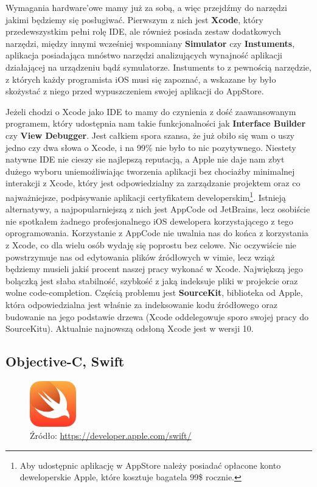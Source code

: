 \documentclass{article}
\begin{document}
Wymagania hardware'owe mamy już za sobą, a więc przejdźmy do narzędzi jakimi będziemy
się posługiwać. Pierwszym z nich jest \textbf{Xcode}, który przedewszystkim pełni
rolę IDE, ale również posiada zestaw dodatkowych narzędzi, między innymi wcześniej
wspomniany \textbf{Simulator} czy \textbf{Instuments}, aplikacja posiadająca mnóstwo
narzędzi analizujących wynajność aplikacji działającej na urządzeniu bądź symulatorze.
Instuments to z pewnością narzędzie, z których każdy programista iOS musi się
zapoznać, a wskazane by było skożystać z niego przed wypuszczeniem swojej aplikacji
do AppStore.

Jeżeli chodzi o Xcode jako IDE to mamy do czynienia z dość zaawansowanym programem,
który udostępnia nam takie funkcjonalności jak \textbf{Interface Builder} czy
\textbf{View Debugger}. Jest całkiem spora szansa, że już obiło się wam o uszy
jedno czy dwa słowa o Xcode, i na 99\% nie było to nic pozytywnego. Niestety 
natywne IDE nie cieszy sie najlepszą reputacją, a Apple nie daje nam zbyt dużego 
wyboru uniemożliwiając tworzenia aplikacji bez chociażby minimalnej interakcji
z Xcode, który jest odpowiedzialny za zarządzanie projektem oraz co najważniejsze,
podpisywanie aplikacji certyfikatem developerskim\footnote{Aby udostępnic aplikację
w AppStore należy posiadać opłacone konto deweloperskie Apple, które kosztuje 
bagatela 99\$ rocznie.}. Istnieją alternatywy, a najpopularniejszą z nich jest
AppCode od JetBrains, lecz osobiście nie spotkałem żadnego profesjonalnego iOS
dewelopera korzystającego z tego oprogramowania. Korzystanie z AppCode nie
uwalnia nas do końca z korzystania z Xcode, co dla wielu osób wydaję się poprostu
bez celowe. Nic oczywiście nie powstrzymuje nas od edytowania plików źródłowych
w vimie, lecz wziąż będziemy musieli jakiś procent naszej pracy wykonać w Xcode.
Największą jego bolączką jest słaba stabilność, szybkość z jaką indeksuje
pliki w projekcie oraz wolne code-completion. Częścią problemu jest 
\textbf{SourceKit}, biblioteka od Apple, która odpowiedzialna jest właśnie za
indeksowanie kodu źródłowego oraz budowanie na jego podstawie drzewa (Xcode 
oddelegowuje sporo swojej pracy do SourceKitu). Aktualnie najnowszą odsłoną
Xcode jest w wersji 10.

\subsection*{Objective-C, Swift}

\begin{figure}[h]
\centering
\includegraphics[width=2cm]{swift-128_2x}
\caption{Źródło: \url{https://developer.apple.com/swift/}}
\end{figure}
\end{document}
